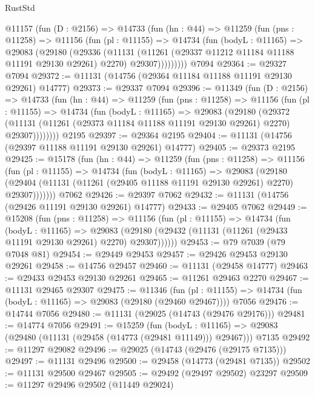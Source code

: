 \begin{lexlean}{RustStd}
\begin{coremodule}
    @11157
      (fun (D : @2156) =>
      @14733
        (fun (hn : @44) =>
        @11259
          (fun (pns : @11258) =>
          @11156
            (fun (pl : @11155) =>
            @14734
              (fun (bodyL : @11165) =>
              @29083
                (@29180
                  (@29336
                    (@11131
                      (@11261 (@29337 @11212 @11184 @11188 @11191 @29130 @29261) @2270)
                      @29307)))))))))
    @7094
@29364 := @29327 @7094
@29372 := @11131 (@14756 (@29364 @11184 @11188 @11191 @29130 @29261) @14777)
@29373 := @29337 @7094
@29396 := @11349
    (fun (D : @2156) =>
    @14733
      (fun (hn : @44) =>
      @11259
        (fun (pns : @11258) =>
        @11156
          (fun (pl : @11155) =>
          @14734
            (fun (bodyL : @11165) =>
            @29083
              (@29180
                (@29372
                  (@11131 (@11261 (@29373 @11184 @11188 @11191 @29130 @29261) @2270) @29307))))))))
    @2195
@29397 := @29364 @2195
@29404 := @11131 (@14756 (@29397 @11188 @11191 @29130 @29261) @14777)
@29405 := @29373 @2195
@29425 := @15178
    (fun (hn : @44) =>
    @11259
      (fun (pns : @11258) =>
      @11156
        (fun (pl : @11155) =>
        @14734
          (fun (bodyL : @11165) =>
          @29083
            (@29180
              (@29404 (@11131 (@11261 (@29405 @11188 @11191 @29130 @29261) @2270) @29307)))))))
    @7062
@29426 := @29397 @7062
@29432 := @11131 (@14756 (@29426 @11191 @29130 @29261) @14777)
@29433 := @29405 @7062
@29449 := @15208
    (fun (pns : @11258) =>
    @11156
      (fun (pl : @11155) =>
      @14734
        (fun (bodyL : @11165) =>
        @29083 (@29180 (@29432 (@11131 (@11261 (@29433 @11191 @29130 @29261) @2270) @29307))))))
@29453 := @79 @7039 (@79 @7048 @81)
@29454 := @29449 @29453
@29457 := @29426 @29453 @29130 @29261
@29458 := @14756 @29457
@29460 := @11131 (@29458 @14777)
@29463 := @29433 @29453 @29130 @29261
@29465 := @11261 @29463 @2270
@29467 := @11131 @29465 @29307
@29475 := @11346
    (fun (pl : @11155) => @14734 (fun (bodyL : @11165) => @29083 (@29180 (@29460 @29467))))
    @7056
@29476 := @14744 @7056
@29480 := @11131 (@29025 (@14743 (@29476 @29176)))
@29481 := @14774 @7056
@29491 := @15259
    (fun (bodyL : @11165) => @29083 (@29480 (@11131 (@29458 (@14773 (@29481 @11149))) @29467)))
    @7135
@29492 := @11297 @29082
@29496 := @29025 (@14743 (@29476 (@29175 @7135)))
@29497 := @11131 @29496
@29500 := @29458 (@14773 (@29481 @7135))
@29502 := @11131 @29500 @29467
@29505 := @29492 (@29497 @29502) @23297
@29509 := @11297 @29496 @29502 (@11449 @29024)

\end{coremodule}
\end{lexlean}
